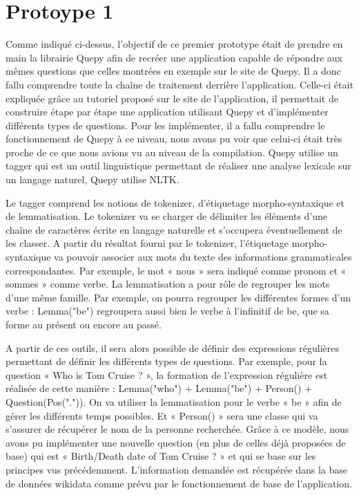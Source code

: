 \documentclass[11pt,a4paper]{article}
\begin{document}
\section*{Protoype 1}\par
Comme indiqué ci-dessus, l’objectif de ce premier prototype était de prendre en main la librairie Quepy afin de recréer une application capable de répondre aux mêmes questions que celles montrées en exemple sur le site de Quepy. Il a donc fallu comprendre toute la chaîne de traitement derrière l’application. Celle-ci était expliquée grâce au tutoriel proposé sur le site de l’application, il permettait de construire étape par étape une application utilisant Quepy et d’implémenter différents types de questions. Pour les implémenter, il a fallu comprendre le fonctionnement de Quepy à ce niveau, nous avons pu voir que celui-ci était très proche de ce que nous avions vu au niveau de la compilation. Quepy utilise un tagger qui est un outil linguistique permettant de réaliser une analyse lexicale sur un langage naturel, Quepy utilise NLTK. \par
Le tagger comprend les notions de tokenizer, d’étiquetage morpho-syntaxique et de lemmatisation. Le tokenizer va se charger de délimiter les éléments d’une chaîne de caractères écrite en langage naturelle et s’occupera éventuellement de les classer. A partir du résultat fourni par le tokenizer, l’étiquetage morpho-syntaxique va pouvoir associer aux mots du texte des informations grammaticales correspondantes. Par exemple, le mot « nous » sera indiqué comme pronom et « sommes » comme verbe. La lemmatisation a pour rôle de regrouper les mots d’une même famille. Par exemple, on pourra regrouper les différentes formes d’un verbe : Lemma("be") regroupera aussi bien le verbe à l’infinitif de be, que sa forme au présent ou encore au passé. \par
A partir de ces outils, il sera alors possible de définir des expressions régulières permettant de définir les différents types de questions. Par exemple, pour la question « Who is Tom Cruise ? », la formation de l’expression régulière est réalisée de cette manière : Lemma("who") + Lemma("be") + Person() + Question(Pos(".")). On va utiliser la lemmatisation pour le verbe « be » afin de gérer les différents temps possibles. Et « Person() » sera une classe qui va s’assurer de récupérer le nom de la personne recherchée. Grâce à ce modèle, nous avons pu implémenter une nouvelle question (en plus de celles déjà proposées de base) qui est « Birth/Death date of Tom Cruise ? » et qui se base sur les principes vus précédemment. L’information demandée est récupérée dans la base de données wikidata comme prévu par le fonctionnement de base de l’application.
\end{document}
